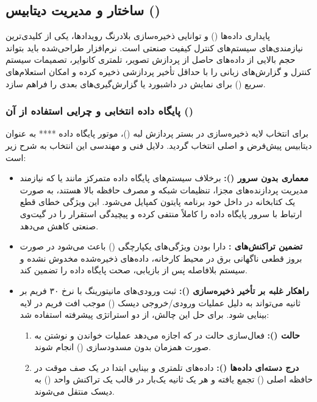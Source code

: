 \documentclass[a4paper, 10pt, twocolumn]{article}
\begin{document}
	\subsection{ساختار و مدیریت دیتابیس ()}
	
	پایداری داده‌ها () و توانایی ذخیره‌سازی بلادرنگ رویدادها، یکی از کلیدی‌ترین نیازمندی‌های سیستم‌های کنترل کیفیت صنعتی است. نرم‌افزار طراحی‌شده باید بتواند حجم بالایی از داده‌های حاصل از پردازش تصویر، تلمتری کانوایر، تصمیمات سیستم کنترل و گزارش‌های زبانی را با حداقل تأخیر پردازشی ذخیره کرده و امکان استعلام‌های سریع () برای نمایش در داشبورد یا گزارش‌گیری‌های بعدی را فراهم سازد.
	
	\subsubsection{پایگاه داده انتخابی و چرایی استفاده از آن ()}
	برای انتخاب لایه ذخیره‌سازی در بستر پردازش لبه ()، موتور پایگاه داده ** به عنوان دیتابیس پیش‌فرض و اصلی انتخاب گردید. دلایل فنی و مهندسی این انتخاب به شرح زیر است:
	
	\begin{itemize}
		\item \textbf{معماری بدون سرور ():} برخلاف سیستم‌های پایگاه داده متمرکز مانند  یا  که نیازمند مدیریت پردازنده‌های مجزا، تنظیمات شبکه و مصرف حافظه بالا هستند،  به صورت یک کتابخانه در داخل خود برنامه پایتون کمپایل می‌شود. این ویژگی خطای قطع ارتباط با سرور پایگاه داده را کاملاً منتفی کرده و پیچیدگی استقرار را در گیت‌وی صنعتی کاهش می‌دهد.
		\item \textbf{تضمین تراکنش‌های :} دارا بودن ویژگی‌های یکپارچگی () باعث می‌شود در صورت بروز قطعی ناگهانی برق در محیط کارخانه، داده‌های ذخیره‌شده مخدوش نشده و سیستم بلافاصله پس از بازیابی، صحت پایگاه داده را تضمین کند.
		\item \textbf{راهکار غلبه بر تأخیر ذخیره‌سازی ():} ثبت ورودی‌های مانیتورینگ با نرخ ۳۰ فریم بر ثانیه می‌تواند به دلیل عملیات ورودی/خروجی دیسک () موجب افت فریم در لایه بینایی شود. برای حل این چالش، از دو استراتژی پیشرفته استفاده شد:
		\begin{enumerate}
			\item \textbf{حالت  ():} فعال‌سازی حالت  در  که اجازه می‌دهد عملیات خواندن و نوشتن به صورت همزمان بدون مسدودسازی () انجام شوند.
			\item \textbf{درج دسته‌ای داده‌ها ():} داده‌های تلمتری و بینایی ابتدا در یک صف موقت در حافظه اصلی () تجمع یافته و هر یک ثانیه یک‌بار در قالب یک تراکنش واحد () به دیسک منتقل می‌شوند.
		\end{enumerate}
	\end{itemize}
	
\end{document}
